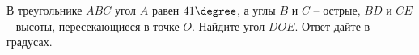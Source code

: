 \begin{ex}
	\begin{condition}
		В треугольнике \( ABC \) угол \( A \) равен \( 41 \degree\), а углы \( B \) и \( C \) – острые, \( BD \) и \( CE \) – высоты, пересекающиеся в точке \(O\). Найдите угол \(DOE\). Ответ дайте в градусах.
	\end{condition}
\end{ex}